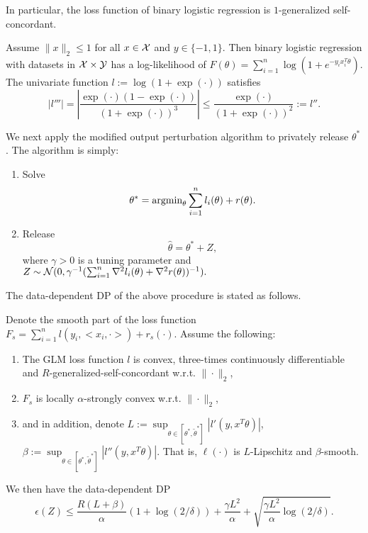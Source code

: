In particular, the loss function of binary logistic regression is $1$-generalized self-concordant.
\begin{example}
	Assume $\|x\|_2\leq 1$ for all $x\in \mathcal{X}$ and $y\in\{-1,1\}$. Then  binary logistic regression with datasets in $\mathcal{X}\times \mathcal{Y}$ has a  log-likelihood of 
	$
	F(\theta) = \sum_{i=1}^n \log(1+e^{-y_i x_i^T\theta}).
	$
	The univariate function $l :=  \log(1+\exp(\cdot))$ satisfies 
	$$|l'''|  =  \left|\frac{\exp{(\cdot)}  (1- \exp{(\cdot)})}{(1+\exp{(\cdot)})^3}\right| \leq  \frac{\exp{(\cdot)}}{(1+\exp{(\cdot)})^2} := l''.$$
\end{example}


We next apply the modified output perturbation algorithm to privately release $\theta^*$.
	The algorithm is simply:
	\begin{enumerate}
		\item Solve
			$$
		\theta^* = \text{argmin}_{\theta}  \sum_{i=1}^n l_i(\theta) + r(\theta).
        $$
		\item Release$$
		\hat{\theta} =  \theta^*  +   Z,$$
		where $\gamma>0$ is a tuning parameter and $Z\sim \mathcal{N}(0, \gamma^{-1} (\sum_{i=1}^n \nabla^2 l_i(\theta)+ \nabla^2 r(\theta))^{-1}).$

	\end{enumerate}


The data-dependent DP of the above procedure is stated as follows.






\begin{theorem}\label{thm: glm}
Denote the smooth part of the loss function $F_s=\sum_{i=1}^n l(y_i, <x_i, \cdot>) + r_s(\cdot)$.
 Assume the following:
	\begin{enumerate}
		\item The GLM loss function $l$ is convex, three-times continuously differentiable and $R$-generalized-self-concordant w.r.t. $\|\cdot\|_2$,
		\item $F_s$ is locally $\alpha$-strongly convex w.r.t. $\|\cdot\|_2$,

		\item and in addition, denote $L := \sup_{\theta\in [\theta^*,\tilde{\theta}^*]}|l'(y,x^T\theta)|$, $\beta := \sup_{\theta\in [\theta^*,\tilde{\theta}^*]}|l''(y,x^T\theta)|$. That is, $\ell(\cdot)$ is $L$-Lipschitz and $\beta$-smooth.
	\end{enumerate}
	We then have the data-dependent DP
	$$\epsilon(Z) \leq   \frac{R(L+\beta)}{\alpha} (1+\log(2/\delta))  +  \frac{\gamma L^2}{\alpha}  + \sqrt{\frac{\gamma L^2}{\alpha}\log(2/\delta)}.$$
\end{theorem}


